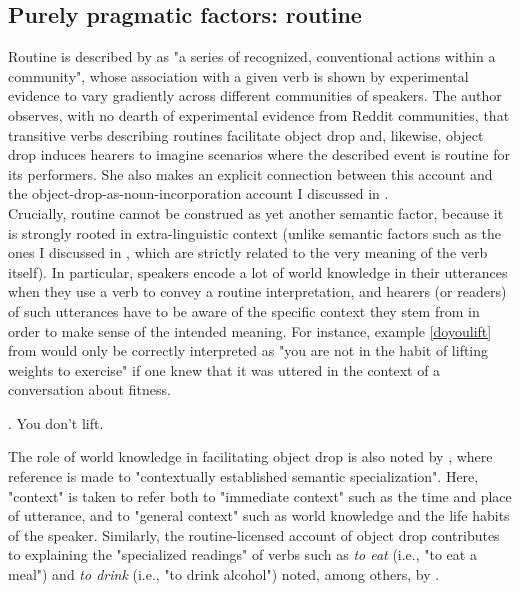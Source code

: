 \subsection{Purely pragmatic factors: routine} 
Routine is described by \textcite[2]{Glass2020} as "a series of recognized, conventional actions within a community", whose association with a given verb is shown by experimental evidence to vary gradiently across different communities of speakers. The author observes, with no dearth of experimental evidence from Reddit communities, that transitive verbs describing routines facilitate object drop and, likewise, object drop induces hearers to imagine scenarios where the described event is routine for its performers. She also makes an explicit connection between this account and the object-drop-as-noun-incorporation account I discussed in .\\
Crucially, routine cannot be construed as yet another semantic factor, because it is strongly rooted in extra-linguistic context (unlike semantic factors such as the ones I discussed in , which are strictly related to the very meaning of the verb itself). In particular, speakers encode a lot of world knowledge in their utterances when they use a verb to convey a routine interpretation, and hearers (or readers) of such utterances have to be aware of the specific context they stem from in order to make sense of the intended meaning. For instance, example \ref{doyoulift} from \textcite[9]{Glass2020} would only be correctly interpreted as "you are not in the habit of lifting weights to exercise" if one knew that it was uttered in the context of a conversation about fitness.

\ex. \label{doyoulift} You don't lift.

The role of world knowledge in facilitating object drop is also noted by \textcite[528]{Eu2018}, where reference is made to "contextually established semantic specialization". Here, "context" is taken to refer both to "immediate context" such as the time and place of utterance, and to "general context" such as world knowledge and the life habits of the speaker. Similarly, the routine-licensed account of object drop contributes to explaining the "specialized readings" of verbs such as \textit{to eat} (i.e., "to eat a meal") and \textit{to drink} (i.e., "to drink alcohol") noted, among others, by \textcite[420]{Naess2011}.


